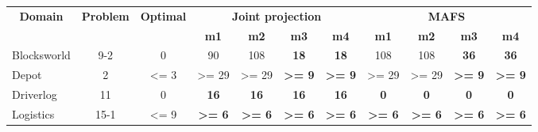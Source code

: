 \documentclass{article}
\theoremstyle{remark}
\begin{document}
{%
\begin{table}[ht]
\begin{tabular}{|l|c|c|c|c|c|c|c|c|c|c|}
\hline
\multicolumn{1}{|c|}{\multirow{2}{*}{\textbf{Domain}}} & \multirow{2}{*}{\textbf{Problem}} & \multirow{2}{*}{\textbf{Optimal}} & \multicolumn{4}{c|}{\textbf{Joint   projection}}                                                                  & \multicolumn{4}{c|}{\textbf{MAFS}}                                                                                \\
\multicolumn{1}{|c|}{}                                 &                                   &                                   & \textbf{m1}                & \textbf{m2}                & \textbf{m3}                & \textbf{m4}                & \textbf{m1}                & \textbf{m2}                & \textbf{m3}                & \textbf{m4}                \\ \hline
Blocksworld                                            & 9-2                               & 0                                 & 90                         & 108                        & \textbf{18}                & \textbf{18}                & 108                        & 108                        & \textbf{36}                & \textbf{36}                \\ \hline
Depot                                                  & 2                                 & \textless{}= 3                    & \textgreater{}= 29         & \textgreater{}= 29         & \textbf{\textgreater{}= 9} & \textbf{\textgreater{}= 9} & \textgreater{}= 29         & \textgreater{}= 29         & \textbf{\textgreater{}= 9} & \textbf{\textgreater{}= 9} \\ \hline
Driverlog                                              & 11                                & 0                                 & \textbf{16}                & \textbf{16}                & \textbf{16}                & \textbf{16}                & \textbf{0}                 & \textbf{0}                 & \textbf{0}                 & \textbf{0}                 \\ \hline
Logistics                                              & 15-1                              & \textless{}= 9                    & \textbf{\textgreater{}= 6} & \textbf{\textgreater{}= 6} & \textbf{\textgreater{}= 6} & \textbf{\textgreater{}= 6} & \textbf{\textgreater{}= 6} & \textbf{\textgreater{}= 6} & \textbf{\textgreater{}= 6} & \textbf{\textgreater{}= 6} \\ \hline

\end{tabular}
\end{table}}
\end{document}
